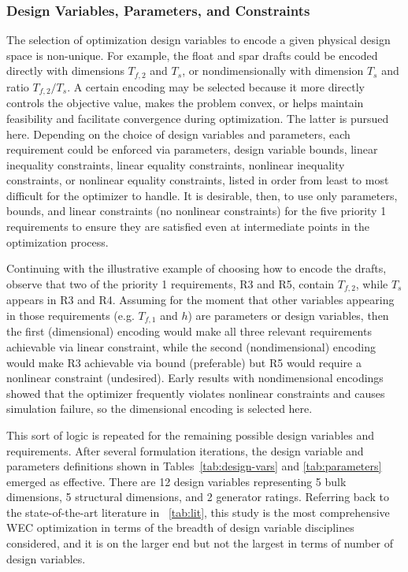 \subsubsection{Design Variables, Parameters, and Constraints}
The selection of optimization design variables to encode a given physical design space is non-unique.
For example, the float and spar drafts could be encoded directly with dimensions $T_{f,2}$ and $T_s$, or nondimensionally with dimension $T_s$ and ratio $T_{f,2}/T_s$.
A certain encoding may be selected because it more directly controls the objective value, makes the problem convex, or helps maintain feasibility and facilitate convergence during optimization.
The latter is pursued here.
Depending on the choice of design variables and parameters, each requirement could be enforced via parameters, design variable bounds, linear inequality constraints, linear equality constraints, nonlinear inequality constraints, or nonlinear equality constraints, listed in order from least to most difficult for the optimizer to handle.
It is desirable, then, to use only parameters, bounds, and linear constraints (no nonlinear constraints) for the five priority 1 requirements to ensure they are satisfied even at intermediate points in the optimization process. 

Continuing with the illustrative example of choosing how to encode the drafts, observe that two of the priority 1 requirements, R3 and R5, contain $T_{f,2}$, while $T_s$ appears in R3 and R4.
Assuming for the moment that other variables appearing in those requirements (e.g. $T_{f,1}$ and $h$) are parameters or design variables, then the first (dimensional) encoding would make all three relevant requirements achievable via linear constraint, while the second (nondimensional) encoding would make R3 achievable via bound (preferable) but R5 would require a nonlinear constraint (undesired).
Early results with nondimensional encodings \cite{mccabe_multidisciplinary_2022} showed that the optimizer frequently violates nonlinear constraints and causes simulation failure, so the dimensional encoding is selected here.

This sort of logic is repeated for the remaining possible design variables and requirements.
After several formulation iterations, the design variable and parameters definitions shown in Tables~\ref{tab:design-vars} and \ref{tab:parameters} emerged as effective.
There are 12 design variables representing 5 bulk dimensions, 5 structural dimensions, and 2 generator ratings.
Referring back to the state-of-the-art literature in \tablename~\ref{tab:lit}, this study is the most comprehensive WEC optimization in terms of the breadth of design variable disciplines considered, and it is on the larger end but not the largest in terms of number of design variables.


